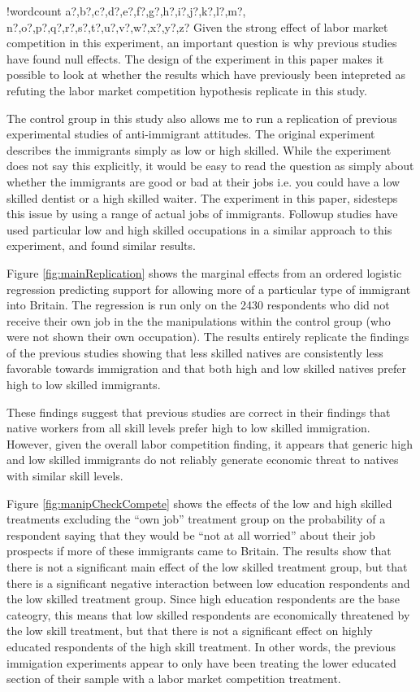 \documentclass{article}\usepackage[]{graphicx}\usepackage[]{color}
\newcounter{words}
\newenvironment{counted}{%
\setcounter{words}{0}
\SearchList!{wordcount}{\stepcounter{words}}
{a?,b?,c?,d?,e?,f?,g?,h?,i?,j?,k?,l?,m?,
n?,o?,p?,q?,r?,s?,t?,u?,v?,w?,x?,y?,z?}
\UndoBoundary{'}
\SearchOrder{p;}}{%
\StopSearching}
\begin{document}
\begin{counted}
Given the strong effect of labor market competition in this experiment, an important question is why previous studies have found null effects. The design of the experiment in this paper makes it possible to look at whether the results which have previously been intepreted as refuting the labor market competition hypothesis replicate in this study. 

The control group in this study also allows me to run a replication of previous experimental studies of anti-immigrant attitudes. The original \textcite{Hainmueller2010} experiment describes the immigrants simply as low or high skilled. While the experiment does not say this explicitly, it would be easy to read the question as simply about whether the immigrants are good or bad at their jobs i.e. you could have a low skilled dentist or a high skilled waiter. The experiment in this paper, sidesteps this issue by using a range of actual jobs of immigrants. 
Followup studies have used particular low and high skilled occupations in a similar approach to this experiment, and found similar results. 

Figure \ref{fig:mainReplication} shows the marginal effects from an ordered logistic regression predicting support for allowing more of a particular type of immigrant into Britain. The regression is run only on the 2430 respondents who did not receive their own job in the the manipulations within the control group (who were not shown their own occupation). The results entirely replicate the findings of the previous studies showing that less skilled natives are consistently less favorable towards immigration and that both high and low skilled natives prefer high to low skilled immigrants.

These findings suggest that previous studies are correct in their findings that native workers from all skill levels prefer high to low skilled immigration. However, given the overall labor competition finding, it appears that generic high and low skilled immigrants do not reliably generate economic threat to natives with similar skill levels.

Figure \ref{fig:manipCheckCompete} shows the effects of the low and high skilled treatments excluding the ``own job'' treatment group on the probability of a respondent saying that they would be ``not at all worried'' about their job prospects if more of these immigrants came to Britain. The results show that there is not a significant main effect of the low skilled treatment group, but that there is a significant negative interaction between low education respondents and the low skilled treatment group. Since high education respondents are the base cateogry, this means that low skilled respondents are economically threatened by the low skill treatment, but that there is not a significant effect on highly educated respondents of the high skill treatment. In other words, the previous immigation experiments appear to only have been treating the lower educated section of their sample with a labor market competition treatment.


\end{counted}
\end{document}
